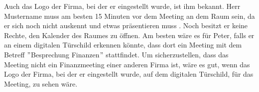 Auch das Logo der Firma, bei der er eingestellt wurde, ist ihm bekannt.
Herr Mustername muss am besten 15 Minuten vor dem Meeting an dem Raum sein, da er sich noch nicht auskennt und etwas präsentieren muss .
Noch besitzt er keine Rechte, den Kalender des Raumes zu öffnen.
\newline
Am besten wäre es für Peter, falls er an einem digitalen Türschild erkennen könnte, dass dort ein Meeting mit dem Betreff \("\)Besprechung Finanzen\("\) stattfindet.
Um sicherzustellen, dass das Meeting nicht ein Finanzmeeting einer anderen Firma ist, wäre es gut, wenn das Logo der Firma, bei der er eingestellt wurde, auf dem digitalen Türschild, für das Meeting, zu sehen wäre.
\newline
\newline

\pagebreak
